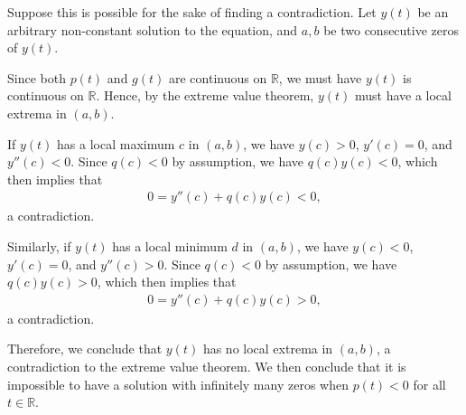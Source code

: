 \documentclass[12pt]{amsart}
\theoremstyle{plain}
\theoremstyle{definition}
\def\mb{\mathbb}
\begin{document}
Suppose this is possible for the sake of finding a contradiction. Let $y(t)$ be an arbitrary non-constant solution to the equation, and $a,b$ be two consecutive zeros of $y(t)$. 

Since both $p(t)$ and $g(t)$ are continuous on $\mb R$, we must have $y(t)$ is continuous on $\mb R$. Hence, by the extreme value theorem, $y(t)$ must have a local extrema in $(a,b)$.

If $y(t)$ has a local maximum $c$ in $(a,b)$, we have $y(c)>0$, $y'(c)=0$, and $y''(c )<0$. Since $q(c)<0$ by assumption, we have $q(c)y(c)<0$, which then implies that 
\begin{align*}
	0=y''(c)+q(c)y(c)<0,
\end{align*}
a contradiction.

Similarly, if $y(t)$ has a local minimum $d$ in $(a,b)$, we have $y(c)<0$, $y'(c)=0$, and $y''(c )>0$. Since $q(c)<0$ by assumption, we have $q(c)y(c)>0$, which then implies that 
\begin{align*}
	0=y''(c)+q(c)y(c)>0,
\end{align*}
a contradiction.

Therefore, we conclude that $y(t)$ has no local extrema in $(a,b)$, a contradiction to the extreme value theorem. We then conclude that it is impossible to have a solution with infinitely many zeros when $p(t)<0$ for all $t\in\mb R$.



\end{document}
